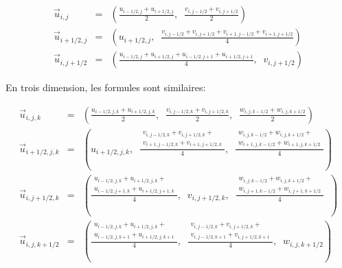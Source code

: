 \documentclass[11pt]{report}
\begin{document}
\begin{eqnarray}
\overrightarrow{u}_{i,j} & = & \left( \frac{u_{i-1/2,j} + u_{i+1/2,j}}{2},\;\; \frac{v_{i, j-1/2} + v_{i, j+1/2}}{2} \right) \\
\overrightarrow{u}_{i+1/2,j} & = & \left(u_{i+1/2,j},\;\; \frac{v_{i, j-1/2} + v_{i, j+1/2} + v_{i+1, j-1/2} + v_{i+1, j+1/2}}{4}  \right) \\
\overrightarrow{u}_{i, j+1/2} & = & \left( \frac{u_{i-1/2, j} + u_{i+1/2, j} + u_{i-1/2, j+1} + u_{i+1/2, j+1}}{4},\;\; v_{i, j+1/2}  \right) 
\end{eqnarray}

En trois dimension, les formules sont similaires:

\begin{eqnarray}
\overrightarrow{u}_{i,j,k} & = & \left(
	\frac{u_{i-1/2,j,k} + u_{i+1/2,j,k}}{2}, \;\; 
	\frac{v_{i,j-1/2,k} + v_{i,j+1/2,k}}{2}, \;\; 
	\frac{w_{i,j,k-1/2} + w_{i,j,k+1/2}}{2}  
\right) \\
\overrightarrow{u}_{i+1/2,j,k} & = & \left( 
	u_{i+1/2,j,k}, \;\; 
	\frac{\begin{array}{c} 
		v_{i,j-1/2,k} + v_{i,j+1/2,k} +\\ 
		v_{i+1, j-1/2, k} + v_{i+1, j+1/2, k} 
		\end{array} }{4}, \;\; 
	\frac{\begin{array}{c}
 		w_{i,j,k-1/2} + w_{i,j,k+1/2} +\\ 
 		w_{i+1,j,k-1/2} + w_{i+1,j,k+1/2}
		\end{array}}{4} 
\right) \\
\overrightarrow{u}_{i,j+1/2,k} & = & \left(
	\frac{\begin{array}{c}
		u_{i-1/2,j,k} + u_{i+1/2,j,k} + \\ 
		u_{i-1/2,j+1,k} + u_{i+1/2,j+1,k}
		\end{array}}{4}, \;\;
	v_{i,j+1/2,k}, \;\;
	\frac{\begin{array}{c}
		w_{i,j,k-1/2} + w_{i,j,k+1/2} + \\
		w_{i,j+1,k-1/2} + w_{i,j+1,k+1/2}
		\end{array}}{4} \;\;
\right) \\
\overrightarrow{u}_{i, j,k+1/2} & = & \left(
	\frac{\begin{array}{c}
		u_{i-1/2,j,k} + u_{i+1/2,j,k} + \\
		u_{i-1/2,j,k+1} + u_{i+1/2,j,k+1}
		\end{array}}{4}, \;\;
	\frac{\begin{array}{c}
		v_{i,j-1/2, k} + v_{i, j+1/2, k} + \\
		v_{i,j-1/2, k+1} + v_{i,j+1/2, k+1}
		\end{array}}{4}, \;\;
	w_{i, j, k+1/2}
\right)
\end{eqnarray}
\end{document}
